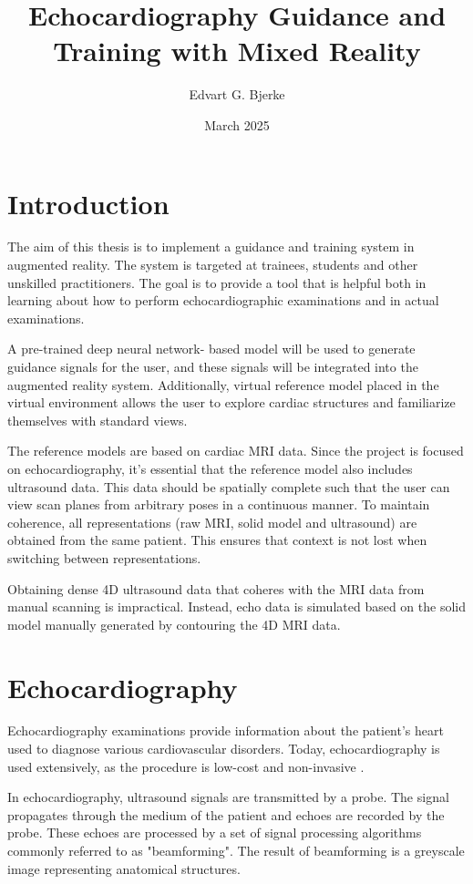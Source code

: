\documentclass{article}
\title{Echocardiography Guidance and Training with Mixed Reality}
\author{Edvart G. Bjerke}
\date{March 2025}
\begin{document}
\maketitle

\section{Introduction}
The aim of this thesis is to implement a guidance and training system in augmented reality. The system is targeted at trainees, students and other unskilled practitioners. The goal is to provide a tool that is helpful both in learning about how to perform echocardiographic examinations and in actual examinations.

A pre-trained deep neural network- based model will be used to generate guidance signals for the user, and these signals will be integrated into the augmented reality system.  
Additionally, virtual reference model placed in the virtual environment allows the user to explore cardiac structures and familiarize themselves with
standard views. 

The reference models are based on cardiac MRI data. 
Since the project is focused on echocardiography, it's essential that the reference model also includes ultrasound data.
This data should be spatially complete such that the user can view scan planes from arbitrary poses in a continuous manner.
To maintain coherence, all representations (raw MRI, solid model and ultrasound) are obtained from the same patient. This ensures that context is not lost when switching between representations.

Obtaining dense 4D ultrasound data that coheres with the MRI data from manual scanning is impractical. Instead,
echo data is simulated based on the solid model manually generated by contouring the 4D MRI data.

\section{Echocardiography}
Echocardiography examinations provide information about the patient's heart used to diagnose various 
cardiovascular disorders. Today, echocardiography is used extensively, as the procedure is low-cost and non-invasive \cite{Omerovic2023}.

In echocardiography, ultrasound signals are transmitted by a probe. The signal propagates through the medium of the patient and echoes are recorded
by the probe. These echoes are processed by a set of signal processing algorithms commonly referred to as "beamforming". The result of beamforming is a
greyscale image representing anatomical structures.
\end{document}
